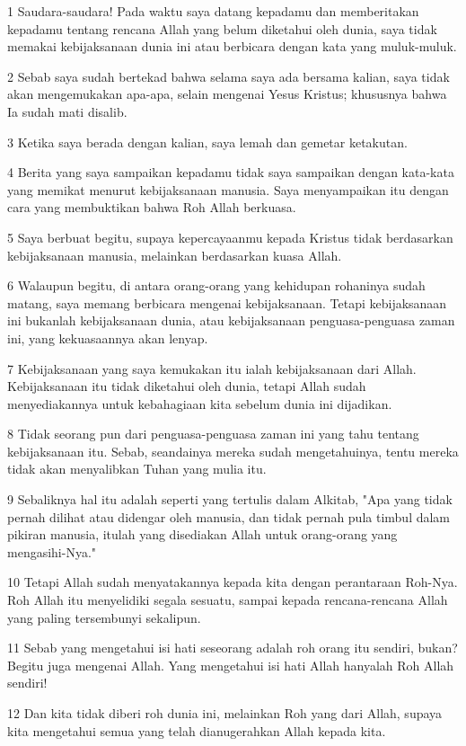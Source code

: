 \par 1 Saudara-saudara! Pada waktu saya datang kepadamu dan memberitakan kepadamu tentang rencana Allah yang belum diketahui oleh dunia, saya tidak memakai kebijaksanaan dunia ini atau berbicara dengan kata yang muluk-muluk.
\par 2 Sebab saya sudah bertekad bahwa selama saya ada bersama kalian, saya tidak akan mengemukakan apa-apa, selain mengenai Yesus Kristus; khususnya bahwa Ia sudah mati disalib.
\par 3 Ketika saya berada dengan kalian, saya lemah dan gemetar ketakutan.
\par 4 Berita yang saya sampaikan kepadamu tidak saya sampaikan dengan kata-kata yang memikat menurut kebijaksanaan manusia. Saya menyampaikan itu dengan cara yang membuktikan bahwa Roh Allah berkuasa.
\par 5 Saya berbuat begitu, supaya kepercayaanmu kepada Kristus tidak berdasarkan kebijaksanaan manusia, melainkan berdasarkan kuasa Allah.
\par 6 Walaupun begitu, di antara orang-orang yang kehidupan rohaninya sudah matang, saya memang berbicara mengenai kebijaksanaan. Tetapi kebijaksanaan ini bukanlah kebijaksanaan dunia, atau kebijaksanaan penguasa-penguasa zaman ini, yang kekuasaannya akan lenyap.
\par 7 Kebijaksanaan yang saya kemukakan itu ialah kebijaksanaan dari Allah. Kebijaksanaan itu tidak diketahui oleh dunia, tetapi Allah sudah menyediakannya untuk kebahagiaan kita sebelum dunia ini dijadikan.
\par 8 Tidak seorang pun dari penguasa-penguasa zaman ini yang tahu tentang kebijaksanaan itu. Sebab, seandainya mereka sudah mengetahuinya, tentu mereka tidak akan menyalibkan Tuhan yang mulia itu.
\par 9 Sebaliknya hal itu adalah seperti yang tertulis dalam Alkitab, "Apa yang tidak pernah dilihat atau didengar oleh manusia, dan tidak pernah pula timbul dalam pikiran manusia, itulah yang disediakan Allah untuk orang-orang yang mengasihi-Nya."
\par 10 Tetapi Allah sudah menyatakannya kepada kita dengan perantaraan Roh-Nya. Roh Allah itu menyelidiki segala sesuatu, sampai kepada rencana-rencana Allah yang paling tersembunyi sekalipun.
\par 11 Sebab yang mengetahui isi hati seseorang adalah roh orang itu sendiri, bukan? Begitu juga mengenai Allah. Yang mengetahui isi hati Allah hanyalah Roh Allah sendiri!
\par 12 Dan kita tidak diberi roh dunia ini, melainkan Roh yang dari Allah, supaya kita mengetahui semua yang telah dianugerahkan Allah kepada kita.
